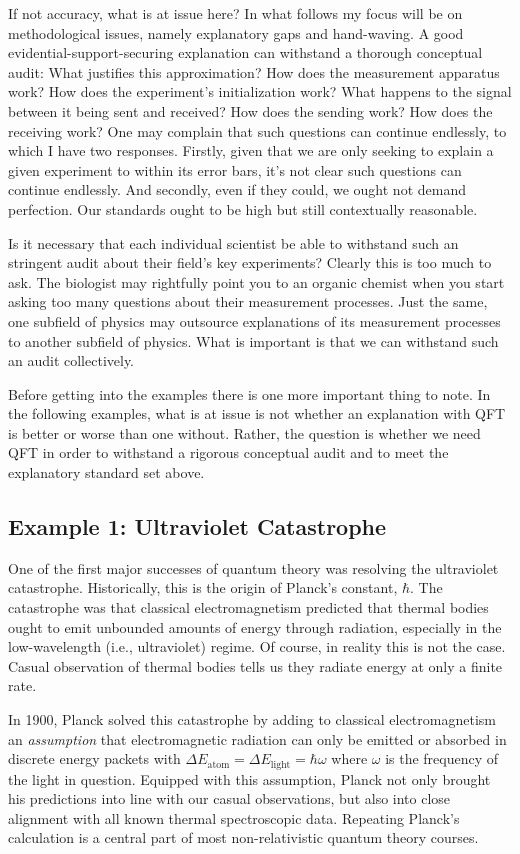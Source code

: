\documentclass[12pt,prd,superscriptaddress,floatfix,amsmath,amssymb,amsfonts,nofootinbib]{revtex4-2}
\begin{document}
If not accuracy, what is at issue here? In what follows my focus will be on methodological issues, namely explanatory gaps and hand-waving. A good evidential-support-securing explanation can withstand a thorough conceptual audit: What justifies this approximation? How does the measurement apparatus work? How does the experiment's initialization work? What happens to the signal between it being sent and received? How does the sending work? How does the receiving work? One may complain that such questions can continue endlessly, to which I have two responses. Firstly, given that we are only seeking to explain a given experiment to within its error bars, it's not clear such questions can continue endlessly. And secondly, even if they could, we ought not demand perfection. Our standards ought to be high but still contextually reasonable.

Is it necessary that each individual scientist be able to withstand such an stringent audit about their field's key experiments? Clearly this is too much to ask. The biologist may rightfully point you to an organic chemist when you start asking too many questions about their measurement processes. Just the same, one subfield of physics may outsource explanations of its measurement processes to another subfield of physics. What is important is that we can withstand such an audit collectively.

Before getting into the examples there is one more important thing to note. In the following examples, what is at issue is not whether an explanation with QFT is better or worse than one without. Rather, the question is whether we need QFT in order to withstand a rigorous conceptual audit and to meet the explanatory standard set above.

\subsection{Example 1: Ultraviolet Catastrophe}
One of the first major successes of quantum theory was resolving the ultraviolet catastrophe. Historically, this is the origin of Planck's constant, $\hbar$. The catastrophe was that classical electromagnetism predicted that thermal bodies ought to emit unbounded amounts of energy through radiation, especially in the low-wavelength (i.e., ultraviolet) regime. Of course, in reality this is not the case. Casual observation of thermal bodies tells us they radiate energy at only a finite rate. 

In 1900, Planck solved this catastrophe by adding to classical electromagnetism an \textit{assumption} that electromagnetic radiation can only be emitted or absorbed in discrete energy packets with \mbox{$\Delta E_\text{atom}=\Delta E_\text{light}=\hbar\omega$} where $\omega$ is the frequency of the light in question. Equipped with this assumption, Planck not only brought his predictions into line with our casual observations, but also into close alignment with all known thermal spectroscopic data. Repeating Planck's calculation is a central part of most non-relativistic quantum theory courses.
\end{document}
